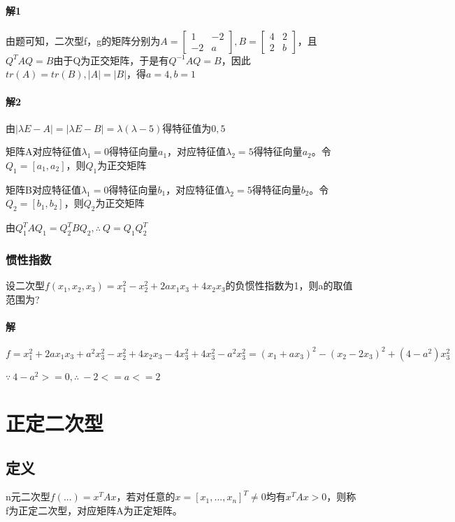 \paragraph{解1}
由题可知，二次型f，g的矩阵分别为\(A = \begin{bmatrix}
    1 & -2 \\ 
    -2 & a
\end{bmatrix}, B = \begin{bmatrix}
    4 & 2 \\ 
    2 & b
\end{bmatrix}\)，且\(Q^TAQ = B\)由于Q为正交矩阵，于是有\(Q^{-1}AQ = B\)，因此\(tr(A) = tr(B), |A| = |B|\)，得\(a = 4, b = 1\)

\paragraph{解2}
由\(|\lambda E - A| = |\lambda E - B| = \lambda(\lambda - 5)\)得特征值为\(0, 5\)

矩阵A对应特征值\(\lambda_1 = 0\)得特征向量\(a_1\)，对应特征值\(\lambda_2 = 5\)得特征向量\(a_2\)。令\(Q_1 = [a_1, a_2]\)，则\(Q_1\)为正交矩阵

矩阵B对应特征值\(\lambda_1 = 0\)得特征向量\(b_1\)，对应特征值\(\lambda_2 = 5\)得特征向量\(b_2\)。令\(Q_2 = [b_1, b_2]\)，则\(Q_2\)为正交矩阵

由\(Q_1^TAQ_1 = Q_2^TBQ_2, \therefore\ Q = Q_1Q_2^T\)


\subsubsection{惯性指数}
设二次型\(f(x_1, x_2, x_3) = x_1^2 - x_2^2 + 2ax_1x_3 + 4x_2x_3\)的负惯性指数为1，则a的取值范围为?

\paragraph{解}
\(f = x_1^2 + 2ax_1x_3 + a^2x_3^2 - x_2^2 + 4x_2x_3 - 4x_3^2 + 4x_3^2 - a^2x_3^2 = (x_1 + ax_3)^2 - (x_2 - 2x_3)^2 + (4 - a^2)x_3^2\)

\(\because\ 4 - a^2 >= 0, \therefore\ -2 <= a <= 2\)


\section{正定二次型}

\subsection{定义}
n元二次型\(f(...) = x^TAx\)，若对任意的\(x = [x_1,..., x_n]^T \neq 0\)均有\(x^TAx > 0\)，则称f为正定二次型，对应矩阵A为正定矩阵。


